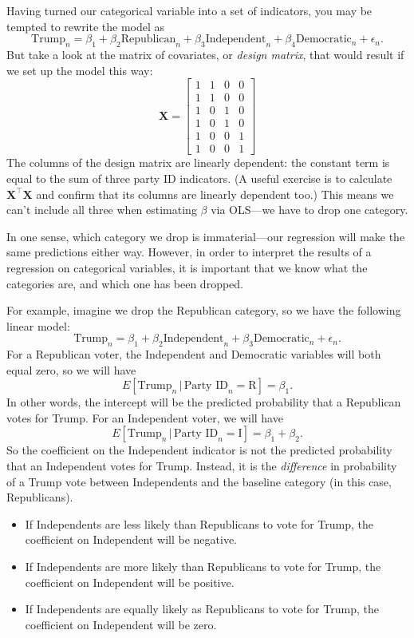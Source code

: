 \documentclass[
  12pt,
  oneside,openany]{book}
\begin{document}
Having turned our categorical variable into a set of indicators, you may be tempted to rewrite the model as
\[
\text{Trump}_n = \beta_1 + \beta_2 \text{Republican}_n + \beta_3 \text{Independent}_n + \beta_4 \text{Democratic}_n + \epsilon_n.
\]
But take a look at the matrix of covariates, or \emph{design matrix}, that would result if we set up the model this way:
\[
\mathbf{X} = \begin{bmatrix}
  1 & 1 & 0 & 0 \\
  1 & 1 & 0 & 0 \\
  1 & 0 & 1 & 0 \\
  1 & 0 & 1 & 0 \\
  1 & 0 & 0 & 1 \\
  1 & 0 & 0 & 1
\end{bmatrix}
\]
The columns of the design matrix are linearly dependent: the constant term is equal to the sum of three party ID indicators. (A useful exercise is to calculate \(\mathbf{X}^\top \mathbf{X}\) and confirm that its columns are linearly dependent too.) This means we can't include all three when estimating \(\beta\) via OLS---we have to drop one category.

In one sense, which category we drop is immaterial---our regression will make the same predictions either way. However, in order to interpret the results of a regression on categorical variables, it is important that we know what the categories are, and which one has been dropped.

For example, imagine we drop the Republican category, so we have the following linear model:
\[
\text{Trump}_n = \beta_1 + \beta_2 \text{Independent}_n + \beta_3 \text{Democratic}_n + \epsilon_n.
\]
For a Republican voter, the Independent and Democratic variables will both equal zero, so we will have
\[
E[\text{Trump}_n \,|\, \text{Party ID}_n = \text{R}] = \beta_1.
\]
In other words, the intercept will be the predicted probability that a Republican votes for Trump. For an Independent voter, we will have
\[
E[\text{Trump}_n \,|\, \text{Party ID}_n = \text{I}] = \beta_1 + \beta_2.
\]
So the coefficient on the Independent indicator is not the predicted probability that an Independent votes for Trump. Instead, it is the \emph{difference} in probability of a Trump vote between Independents and the baseline category (in this case, Republicans).

\begin{itemize}
\item
  If Independents are less likely than Republicans to vote for Trump, the coefficient on Independent will be negative.
\item
  If Independents are more likely than Republicans to vote for Trump, the coefficient on Independent will be positive.
\item
  If Independents are equally likely as Republicans to vote for Trump, the coefficient on Independent will be zero.
\end{itemize}
\end{document}
